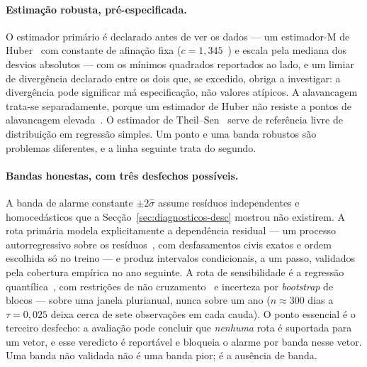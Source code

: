 \paragraph{Estimação robusta, pré-especificada.} O estimador primário é
declarado antes de ver os dados --- um estimador-M de Huber~\cite{Huber1964,HuberRonchetti2009} com constante
de afinação fixa ($c = 1{,}345$~\cite{HollandWelsch1977}) e escala pela
mediana dos desvios absolutos ---
com os mínimos quadrados reportados ao lado, e um limiar de divergência
declarado entre os dois que, se excedido, obriga a investigar: a divergência
pode significar má especificação, não valores atípicos. A alavancagem
trata-se separadamente, porque um estimador de Huber não resiste a pontos de
alavancagem elevada~\cite{RousseeuwLeroy1987}. O estimador de Theil--Sen~\cite{Sen1968} serve de referência livre de
distribuição em regressão simples. Um ponto e uma banda robustos são
problemas diferentes, e a linha seguinte trata do segundo.

\paragraph{Bandas honestas, com três desfechos possíveis.} A banda de alarme
constante $\pm 2\hat\sigma$ assume resíduos independentes e homocedásticos que
a Secção~\ref{sec:diagnosticos-desc} mostrou não existirem. A rota primária
modela explicitamente a dependência residual --- um processo autorregressivo
sobre os resíduos~\cite{BoxJenkins2015}, com desfasamentos civis exatos e
ordem escolhida só no treino --- e produz intervalos condicionais, a um passo, validados pela
cobertura empírica no ano seguinte. A rota de sensibilidade é a regressão
quantílica~\cite{KoenkerBassett1978}, com restrições de não
cruzamento~\cite{Chernozhukov2010} e incerteza por \emph{bootstrap}
de blocos --- sobre uma janela plurianual, nunca sobre um ano ($n \approx
300$ dias a $\tau = 0{,}025$ deixa cerca de sete observações em cada cauda).
O ponto essencial é o terceiro desfecho: a avaliação pode concluir que
\emph{nenhuma} rota é suportada para um vetor, e esse veredicto é
reportável e bloqueia o alarme por banda nesse vetor. Uma banda não
validada não é uma banda pior; é a ausência de banda.

